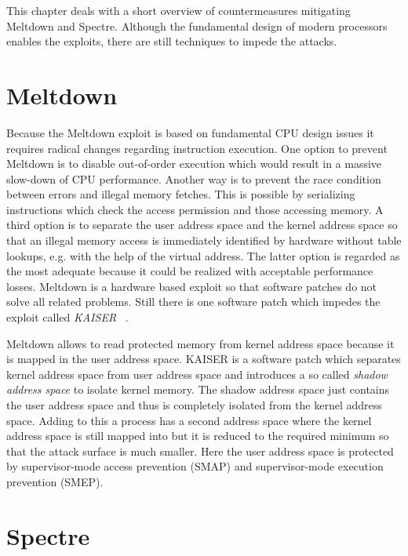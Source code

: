 \documentclass[a4paper,oneside,openright] {scrreprt}
\begin{document}
This chapter deals with a short overview of countermeasures mitigating Meltdown and Spectre. 
Although the fundamental design of modern processors enables the exploits, there are still techniques to impede
the attacks.

\section{Meltdown}
\label{ch:intro:motivation}

Because the Meltdown exploit is based on fundamental CPU design issues it requires radical changes regarding instruction execution.
One option to prevent Meltdown is to disable out-of-order execution which would result in a massive slow-down of CPU performance.
Another way is to prevent the race condition between errors and illegal memory fetches. This is possible by serializing instructions
which check the access permission and those accessing memory.
A third option is to separate the user address space and the kernel address space so that an illegal memory access is immediately
identified by hardware without table lookups, e.g. with the help of the virtual address.
The latter option is regarded as the most adequate because it could be realized with acceptable performance losses.
Meltdown is a hardware based exploit so that software patches do not solve all related problems. 
Still there is one software patch which impedes the exploit called \textit{KAISER} ~\cite{gruss2017kaslr}.

Meltdown allows to read protected memory from kernel address space because it is mapped in the user address space.
KAISER is a software patch which separates kernel address space from user address space 
and introduces a so called \textit{shadow address space} to isolate kernel memory. 
The shadow address space just contains the user address space and thus is completely isolated from the kernel address space.
Adding to this a process has a second address space where the kernel address space is still mapped into 
but it is reduced to the required minimum so that the attack surface is much smaller. 
Here the user address space is protected by supervisor-mode access prevention (SMAP) 
and supervisor-mode execution prevention (SMEP).

\section{Spectre}
\label{ch:intro:motivation}
\end{document}
